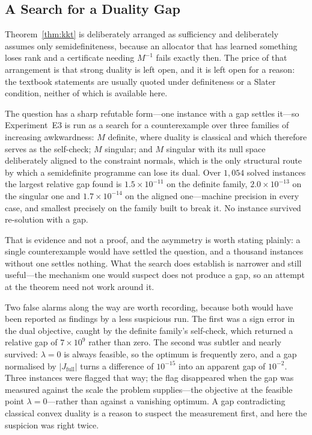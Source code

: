\subsection{A Search for a Duality Gap}
\label{sec:e3results}

Theorem~\ref{thm:kkt} is deliberately arranged as sufficiency and deliberately assumes only
semidefiniteness, because an allocator that has learned something loses rank and a certificate
needing $M^{-1}$ fails exactly then. The price of that arrangement is that strong duality is
left open, and it is left open for a reason: the textbook statements are usually quoted under
definiteness or a Slater condition, neither of which is available here.

The question has a sharp refutable form---one instance with a gap settles it---so
Experiment~E3 is run as a search for a counterexample over three families of increasing
awkwardness: $M$ definite, where duality is classical and which therefore serves as the
self-check; $M$ singular; and $M$ singular with its null space deliberately aligned to the
constraint normals, which is the only structural route by which a semidefinite programme can
lose its dual. Over $1{,}054$ solved instances the largest relative gap found is
$1.5\times10^{-11}$ on the definite family, $2.0\times10^{-13}$ on the singular one and
$1.7\times10^{-14}$ on the aligned one---machine precision in every case, and smallest
precisely on the family built to break it. No instance survived re-solution with a gap.
\NUM{}

That is evidence and not a proof, and the asymmetry is worth stating plainly: a single
counterexample would have settled the question, and a thousand instances without one settles
nothing. What the search does establish is narrower and still useful---the mechanism one would
suspect does not produce a gap, so an attempt at the theorem need not work around it.

Two false alarms along the way are worth recording, because both would have been reported as
findings by a less suspicious run. The first was a sign error in the dual objective, caught by
the definite family's self-check, which returned a relative gap of $7\times10^{9}$ rather than
zero. The second was subtler and nearly survived: $\lambda=0$ is always feasible, so the
optimum is frequently zero, and a gap normalised by $|J_{\mathrm{full}}|$ turns a difference of
$10^{-15}$ into an apparent gap of $10^{-2}$. Three instances were flagged that way; the flag
disappeared when the gap was measured against the scale the problem supplies---the objective at
the feasible point $\lambda=0$---rather than against a vanishing optimum. A gap contradicting
classical convex duality is a reason to suspect the measurement first, and here the suspicion
was right twice.

